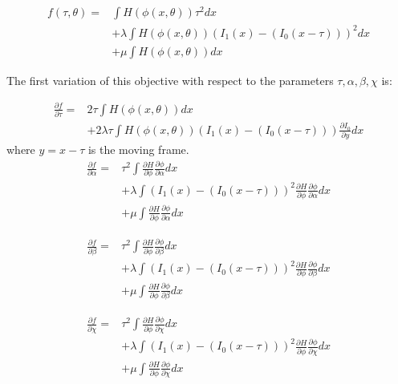 \documentclass[]{article}
\begin{document}
\begin{eqnarray*}
f(\tau,\theta) = & \int H(\phi(x,\theta)) \tau^2 dx \\
& + \lambda \int H(\phi(x,\theta))\left (I_1(x) - (I_0(x-\tau)) \right )^2dx \\
& + \mu \int H(\phi(x,\theta)) dx
\end{eqnarray*}

The first variation of this objective with respect to the parameters
\(\tau, \alpha, \beta, \chi\) is:

\begin{eqnarray*}
\frac{\partial f}{\partial \tau} = & 2\tau\int H(\phi(x,\theta)) dx \\
& + 2\lambda\tau \int H(\phi(x,\theta))\left (I_1(x) - (I_0(x-\tau))
\right )\frac{\partial I_0}{\partial y} dx
\end{eqnarray*}
where \(y = x - \tau\) is the moving frame.
\begin{eqnarray*}
\frac{\partial f}{\partial \alpha} = & \tau^2\int \frac{\partial
  H}{\partial \phi}\frac{\partial \phi}{\partial \alpha} dx \\
& + \lambda \int \left (I_1(x) - (I_0(x-\tau)) \right )^2 \frac{\partial
  H}{\partial \phi}\frac{\partial \phi}{\partial \alpha} dx \\
& + \mu \int \frac{\partial
  H}{\partial \phi}\frac{\partial \phi}{\partial \alpha} dx
\end{eqnarray*}

\begin{eqnarray*}
\frac{\partial f}{\partial \beta} = & \tau^2\int \frac{\partial
  H}{\partial \phi}\frac{\partial \phi}{\partial \beta} dx \\
& + \lambda \int \left (I_1(x) - (I_0(x-\tau)) \right )^2 \frac{\partial
  H}{\partial \phi}\frac{\partial \phi}{\partial \beta} dx \\
& + \mu \int \frac{\partial
  H}{\partial \phi}\frac{\partial \phi}{\partial \beta} dx
\end{eqnarray*}

\begin{eqnarray*}
\frac{\partial f}{\partial \chi} = & \tau^2\int \frac{\partial
  H}{\partial \phi}\frac{\partial \phi}{\partial \chi} dx \\
& + \lambda \int \left (I_1(x) - (I_0(x-\tau)) \right )^2 \frac{\partial
  H}{\partial \phi}\frac{\partial \phi}{\partial \chi} dx \\
& + \mu \int \frac{\partial
  H}{\partial \phi}\frac{\partial \phi}{\partial \chi} dx
\end{eqnarray*}
\end{document}
